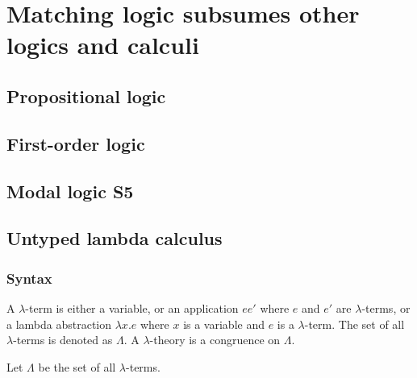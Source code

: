 \section{Matching logic subsumes other logics and calculi}

\subsection{Propositional logic}

\subsection{First-order logic}

\subsection{Modal logic S5}

\subsection{Untyped lambda calculus}

\subsubsection{Syntax}

A $\lambda$-term is either a variable,
or an application $e e'$ where $e$ and $e'$ are $\lambda$-terms,
or a lambda abstraction $\lambda x . e$ where $x$ is a variable
and $e$ is a $\lambda$-term.
The set of all $\lambda$-terms is denoted as $\Lambda$.
A $\lambda$-theory is a congruence on $\Lambda$.

Let $\Lambda$ be the set of all $\lambda$-terms.

